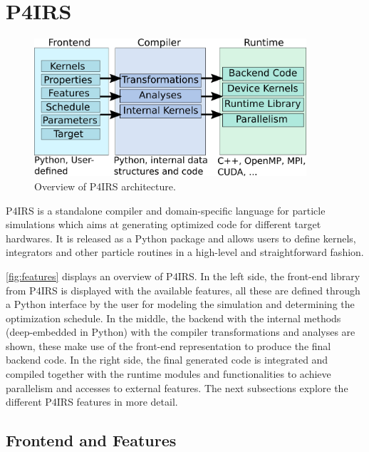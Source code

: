 \documentclass[preprint,12pt]{elsarticle}
\begin{document}
\section{P4IRS}
\label{sec:pairs}


\begin{figure}[htb]
  \centering
  \includegraphics[width=0.9\textwidth]{pairs_overview.png}
  \caption{Overview of P4IRS architecture.}
  \label{fig:features}
\end{figure}

P4IRS is a standalone compiler and domain-specific language for particle simulations which aims at generating optimized code for different target hardwares.
It is released as a Python package and allows users to define kernels, integrators and other particle routines in a high-level and straightforward fashion.

\autoref{fig:features} displays an overview of P4IRS.
In the left side, the front-end library from P4IRS is displayed with the available features, all these are defined through a Python interface by the user for modeling the simulation and determining the optimization schedule.
In the middle, the backend with the internal methods (deep-embedded in Python) with the compiler transformations and analyses are shown, these make use of the front-end representation to produce the final backend code.
In the right side, the final generated code is integrated and compiled together with the runtime modules and functionalities to achieve parallelism and accesses to external features.
The next subsections explore the different P4IRS features in more detail.

\subsection{Frontend and Features}
\label{sec:frontend}
\end{document}
